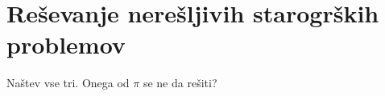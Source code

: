 \section{Reševanje nerešljivih starogrških problemov}
\label{pogl:starogrskiproblemi}

Naštev vse tri. Onega od $\pi$ se ne da rešiti?